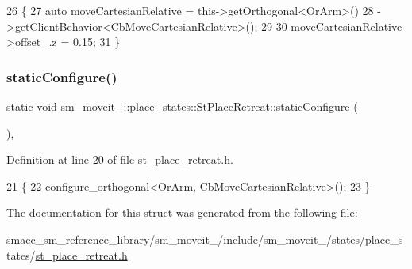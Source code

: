 \begin{DoxyCode}
26     \{
27         \textcolor{keyword}{auto} moveCartesianRelative = this->getOrthogonal<OrArm>()
28                                          ->getClientBehavior<CbMoveCartesianRelative>();
29 
30         moveCartesianRelative->offset\_.z = 0.15;
31     \}
\end{DoxyCode}
\mbox{\label{structsm__moveit__4_1_1place__states_1_1StPlaceRetreat_aa3f44a56c5471fb113afb7b3cfd7d44e}} 
\subsubsection{\texorpdfstring{static\+Configure()}{staticConfigure()}}
{\footnotesize\ttfamily static void sm\+\_\+moveit\+\_\+::place\+\_\+states\+::\+St\+Place\+Retreat\+::static\+Configure (\begin{DoxyParamCaption}{ }\end{DoxyParamCaption})\hspace{0.3cm}{\ttfamily [inline]}, {\ttfamily [static]}}



Definition at line 20 of file st\+\_\+place\+\_\+retreat.\+h.


\begin{DoxyCode}
21     \{
22         configure\_orthogonal<OrArm, CbMoveCartesianRelative>();
23     \}
\end{DoxyCode}


The documentation for this struct was generated from the following file\+:\begin{DoxyCompactItemize}
\item 
smacc\+\_\+sm\+\_\+reference\+\_\+library/sm\+\_\+moveit\+\_/include/sm\+\_\+moveit\+\_/states/place\+\_\+states/\hyperlink{4_2include_2sm__moveit__4_2states_2place__states_2st__place__retreat_8h}{st\+\_\+place\+\_\+retreat.\+h}\end{DoxyCompactItemize}
